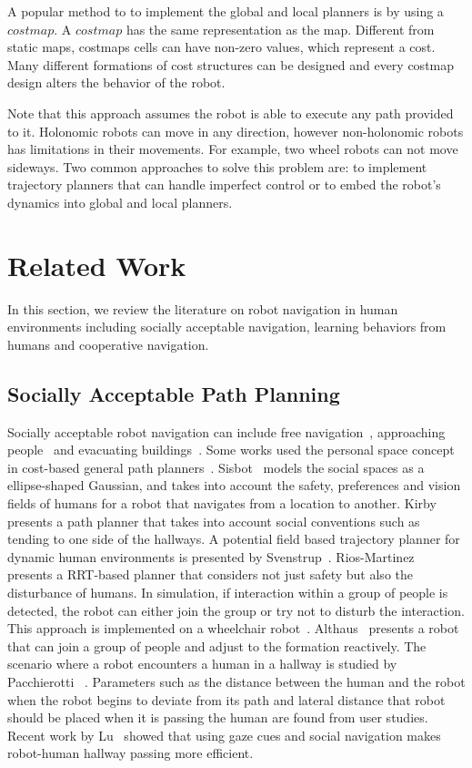 A popular method to to implement the global and local planners is by using a $costmap$. A $costmap$ has the same representation as the map. Different from static maps, costmaps cells can have non-zero values, which represent a cost. Many different formations of cost structures can be designed and every costmap design alters the behavior of the robot.

Note that this approach assumes the robot is able to execute any path provided to it. Holonomic robots can move in any direction, however non-holonomic robots has limitations in their movements. For example, two wheel robots can not move sideways. Two common approaches to solve this problem are: to implement trajectory planners that can handle imperfect control or to embed the robot's dynamics into global and local planners.

\section{Related Work}
\label{sec:navigation_related_work}

In this section, we review the literature on robot navigation in human environments including socially acceptable navigation, learning behaviors from humans and cooperative navigation.

\subsection{Socially Acceptable Path Planning}
Socially acceptable robot navigation can include free navigation~\cite{sisbot2007human}, approaching people~\cite{satake2009approach} and evacuating buildings~\cite{ohki2010collision}. Some works used the personal space concept in cost-based general path planners~\cite{sisbot2007human,kirby2009companion}. Sisbot~\cite{sisbot2007human} models the social spaces as a ellipse-shaped Gaussian, and takes into account the safety, preferences and vision fields of humans for a robot that navigates from a location to another. Kirby~\cite{kirby2009companion} presents a path planner that takes into account social conventions such as tending to one side of the hallways. A potential field based trajectory planner for dynamic human environments is presented by Svenstrup~\cite{svenstrup2010trajectory}. Rios-Martinez~\cite{rios2011understanding} presents a RRT-based planner that considers not just safety but also the disturbance of humans. In simulation, if interaction within a group of people is detected, the robot can either join the group or try not to disturb the interaction. This approach is implemented on a wheelchair robot~\cite{vasquez2012human}. Althaus~\cite{althaus2004navigation} presents a robot that can join a group of people and adjust to the formation reactively. The scenario where a robot encounters a human in a hallway is studied by Pacchierotti ~\cite{pacchierotti2005human}. Parameters such as the distance between the human and the robot when the robot begins to deviate from its path and lateral distance that robot should be placed when it is passing the human are found from user studies. Recent work by Lu~\cite{lu2013towards} showed that using gaze cues and social navigation makes robot-human hallway passing more efficient.

